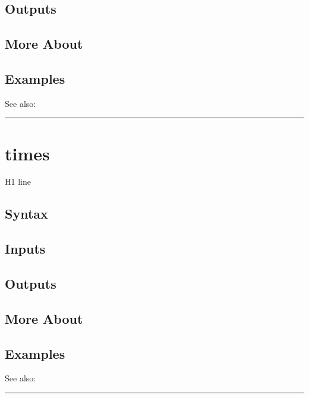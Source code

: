 \documentclass[letterpaper,10pt,english]{sphinxmanual}
\begin{document}
\subsection{Outputs}
\label{classes/time_series/@ts/ts:id569}

\subsection{More About}
\label{classes/time_series/@ts/ts:id570}

\subsection{Examples}
\label{classes/time_series/@ts/ts:id571}
See also:


\bigskip\hrule{}\bigskip



\section{times}
\label{classes/time_series/@ts/ts:id572}\label{classes/time_series/@ts/ts:times}
H1 line


\subsection{Syntax}
\label{classes/time_series/@ts/ts:id573}

\subsection{Inputs}
\label{classes/time_series/@ts/ts:id574}

\subsection{Outputs}
\label{classes/time_series/@ts/ts:id575}

\subsection{More About}
\label{classes/time_series/@ts/ts:id576}

\subsection{Examples}
\label{classes/time_series/@ts/ts:id577}
See also:


\bigskip\hrule{}\bigskip
\end{document}
